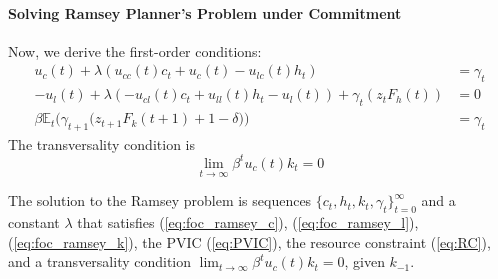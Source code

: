 \documentclass[12pt]{article}
\newcommand{\E}{\mathbb{E}}
\begin{document}
\paragraph{Solving Ramsey Planner's Problem under Commitment \\ [6pt]}
	Now, we derive the first-order conditions:
	\begin{align}
		u_c(t) + \lambda (u_{cc}(t)c_t + u_c(t) - u_{lc}(t)h_t) &= \gamma_t \label{eq:foc_ramsey_c}\\
		- u_l(t) + \lambda(-u_{cl}(t)c_t +u_{ll}(t)h_t - u_l(t)) + \gamma_t (z_t F_h(t)) &= 0 \label{eq:foc_ramsey_l}\\
		\beta \E_t \Big(\gamma_{t+1} \big(z_{t+1} F_k(t+1) + 1 - \delta\big)\Big) &= \gamma_t \label{eq:foc_ramsey_k}
	\end{align}
		The transversality condition is
	\begin{equation*}
		\lim_{t \rightarrow \infty} \beta^t u_c(t)k_t = 0
	\end{equation*}
	\begin{proposition}
		The solution to the Ramsey problem is sequences $\{c_t, h_t, k_t, \gamma_t\}_{t=0}^\infty$ and a constant $\lambda$ that satisfies (\ref{eq:foc_ramsey_c}), (\ref{eq:foc_ramsey_l}), (\ref{eq:foc_ramsey_k}), the PVIC (\ref{eq:PVIC}), the resource constraint (\ref{eq:RC}), and a transversality condition $\lim_{t \rightarrow \infty} \beta^t u_c(t)k_t = 0$, given $k_{-1}$.
	\end{proposition}
	
	\noindent
\end{document}
